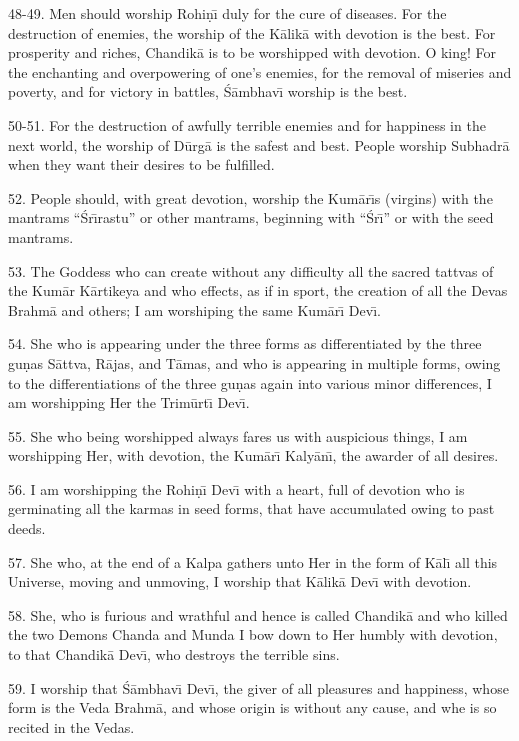 48-49. Men should worship Rohi\d{n}\={\i} duly for the cure of diseases. For the destruction of enemies, the worship of the K\=alik\=a with devotion is the best. For prosperity and riches, Chandik\=a is to be worshipped with devotion. O king! For the enchanting and overpowering of one's enemies, for the removal of miseries and poverty, and for victory in battles, \'S\=ambhav\={\i} worship is the best.

50-51. For the destruction of awfully terrible enemies and for happiness in the next world, the worship of D\=urg\=a is the safest and best. People worship Subhadr\=a when they want their desires to be fulfilled.

52. People should, with great devotion, worship the Kum\=ar\={\i}s (virgins) with the mantrams ``\'Sr\={\i}rastu'' or other mantrams, beginning with ``\'Sr\={\i}'' or with the seed mantrams.

53. The Goddess who can create without any difficulty all the sacred tattvas of the Kum\=ar K\=artikeya and who effects, as if in sport, the creation of all the Devas Brahm\=a and others; I am worshiping the same Kum\=ar\={\i} Dev\={\i}.

54. She who is appearing under the three forms as differentiated by the three gu\d{n}as S\=attva, R\=ajas, and T\=amas, and who is appearing in multiple forms, owing to the differentiations of the three gu\d{n}as again into various minor differences, I am worshipping Her the Trim\=urt\={\i} Dev\={\i}.

55. She who being worshipped always fares us with auspicious things, I am worshipping Her, with devotion, the Kum\=ar\={\i} Kaly\=an\={\i}, the awarder of all desires.

56. I am worshipping the Rohi\d{n}\={\i} Dev\={\i} with a heart, full of devotion who is germinating all the karmas in seed forms, that have accumulated owing to past deeds.

57. She who, at the end of a Kalpa gathers unto Her in the form of K\=al\={\i} all this Universe, moving and unmoving, I worship that K\=alik\=a Dev\={\i} with devotion.

58. She, who is furious and wrathful and hence is called Chandik\=a and who killed the two Demons Chanda and Munda I bow down to Her humbly with devotion, to that Chandik\=a Dev\={\i}, who destroys the terrible sins.

59. I worship that \'S\=ambhav\={\i} Dev\={\i}, the giver of all pleasures and happiness, whose form is the Veda Brahm\=a, and whose origin is without any cause, and whe is so recited in the Vedas.

